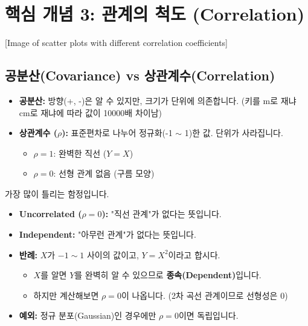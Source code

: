 \documentclass[11pt,a4paper]{book}
\theoremstyle{definition}
\begin{document}
\section{핵심 개념 3: 관계의 척도 (Correlation)}


[Image of scatter plots with different correlation coefficients]


\subsection{공분산(Covariance) vs 상관계수(Correlation)}
\begin{itemize}
    \item \textbf{공분산:} 방향(+, -)은 알 수 있지만, 크기가 단위에 의존합니다. (키를 m로 재냐 cm로 재냐에 따라 값이 10000배 차이남)
    \item \textbf{상관계수 ($\rho$):} 표준편차로 나누어 정규화(-1 $\sim$ 1)한 값. 단위가 사라집니다.
    \begin{itemize}
        \item $\rho=1$: 완벽한 직선 ($Y=X$)
        \item $\rho=0$: 선형 관계 없음 (구름 모양)
    \end{itemize}
\end{itemize}

\begin{warningbox}[title={Uncorrelated $\neq$ Independent}]
가장 많이 틀리는 함정입니다.
\begin{itemize}
    \item \textbf{Uncorrelated ($\rho=0$):} "직선 관계"가 없다는 뜻입니다.
    \item \textbf{Independent:} "아무런 관계"가 없다는 뜻입니다.
    \item \textbf{반례:} $X$가 $-1 \sim 1$ 사이의 값이고, $Y = X^2$이라고 합시다.
        \begin{itemize}
            \item $X$를 알면 $Y$를 완벽히 알 수 있으므로 \textbf{종속(Dependent)}입니다.
            \item 하지만 계산해보면 $\rho = 0$이 나옵니다. (2차 곡선 관계이므로 선형성은 0)
        \end{itemize}
    \item \textbf{예외:} 정규 분포(Gaussian)인 경우에만 $\rho=0$이면 독립입니다.
\end{itemize}
\end{warningbox}
\end{document}
